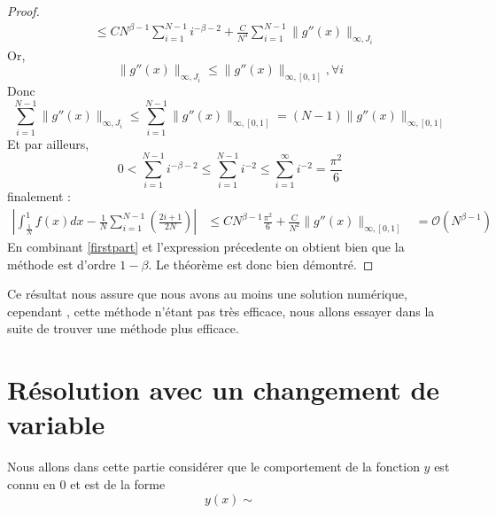 \documentclass[a4paper,10pt]{article}
\begin{document}
\begin{proof}
\begin{equation}
\begin{align}
									     &\leq C N^{\beta - 1} \sum_{i=1}^{N-1}i^{-\beta - 2} + \frac{C}{N^3}\sum_{i=1}^{N-1} \|g''(x)  \|_{\infty, J_i}
 \end{align}
\end{equation}
Or,
\begin{equation}
 \|g''(x)  \|_{\infty, J_i} \leq \|g''(x)  \|_{\infty, [0,1]}, \forall i
\end{equation}
Donc
\begin{equation}
 \sum_{i=1}^{N-1}\|g''(x)  \|_{\infty, J_i} \leq \sum_{i=1}^{N-1}\|g''(x)  \|_{\infty, [0,1]} = (N-1)\|g''(x)  \|_{\infty, [0,1]} 
\end{equation}
Et par ailleurs,
\begin{equation}
 0 < \sum_{i=1}^{N-1}i^{-\beta - 2} \leq \sum_{i=1}^{N-1}i^{- 2} \leq \sum_{i=1}^{\infty}i^{- 2} = \frac{\pi ^2}{6}  
\end{equation}
finalement :
\begin{equation}
\begin{align}
 |\int_\frac{1}{N}^1f(x)dx - \frac{1}{N}\sum_{i=1}^{N-1}(\frac{2i + 1}{2N})| &\leq C N^{\beta - 1} \frac{\pi ^2}{6}  + \frac{C}{N^2}\|g''(x)  \|_{\infty, [0,1]} 
									     &= \mathcal{O}(N^{\beta - 1}) 
\end{align}
\end{equation}
 En combinant \ref{firstpart} et l'expression pr\'ecedente on obtient bien que la m\'ethode est d'ordre $1- \beta$. Le th\'eor\`eme est donc bien d\'emontr\'e.
\end{proof}
Ce r\'esultat nous assure que nous avons au moins une solution num\'erique, cependant , cette m\'ethode n'\'etant pas tr\`es efficace, nous allons essayer dans la suite de trouver une m\'ethode plus efficace.

\section{R\'esolution avec un changement de variable}
Nous allons dans cette partie consid\'erer que le comportement de la fonction $y$ est connu en 0 et est de la forme
\begin{equation}
 y(x)\sim
\end{equation}
\end{document}
